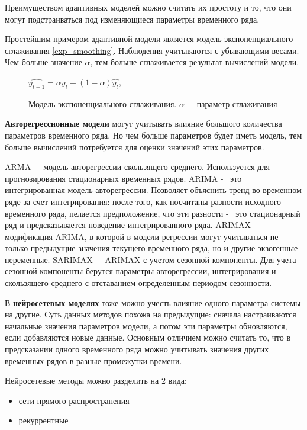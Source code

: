 Преимуществом адаптивных моделей можно считать их простоту и то, что они могут подстраиваться
под изменяющиеся параметры временного ряда.

Простейшим примером адаптивной модели является модель экспоненциального сглаживания \ref{exp_smoothing}.
Наблюдения учитываются с убывающими весами. %
Чем больше значение $ \alpha $, тем больше сглаживается результат вычислений модели.

\def\figurename{Формула}
\begin{figure}
	\centering
	$ \hat{y_{t+1}} = \alpha y_t + (1 - \alpha)\hat{y_t} $,
	\caption{
		Модель экспоненциального сглаживания.
		$ \alpha $ -~ параметр сглаживания
	}
	\label{img:exp_smoothing}
\end{figure}
\def\figurename{Рис.}


\textbf{Авторегрессионные модели} могут учитывать влияние большого количества параметров
временного ряда. Но чем больше параметров будет иметь модель, тем больше вычислений
потребуется для оценки значений этих параметров.

ARMA -~ модель авторегрессии скользящего среднего. Используется для прогнозирования
стационарных временных рядов.
ARIMA -~ это интегрированная модель авторегрессии. Позволяет объяснить тренд во временном
ряде за счет интегрирования: после того, как посчитаны разности исходного временного ряда,
пелается предположение, что эти разности -~ это стационарный ряд и предсказывается поведение
интегрированного ряда.
ARIMAX -~ модификация ARIMA, в которой в модели регрессии могут учитываться не только предыдущие значения
текущего временного ряда, но и другие экзогенные переменные.
SARIMAX -~ ARIMAX с учетом сезонной компоненты. Для учета сезонной компоненты
берутся параметры авторегрессии, интегрирования и скользящего среднего с отставанием
определенным периодом сезонности.


В \textbf{нейросетевых моделях} тоже можно учесть влияние одного параметра системы на другие.
Суть данных методов похожа на предыдущие: сначала настраиваются начальные
значения параметров модели, а потом эти параметры обновляются, если добавляются новые данные.
Основным отличием можно считать то, что в предсказании одного временного ряда можно
учитывать значения других временных рядов в разные промежутки времени.

Нейросетевые методы можно разделить на 2 вида:
\begin{itemize}
	\item сети прямого распространения
	\item рекуррентные
\end{itemize}

